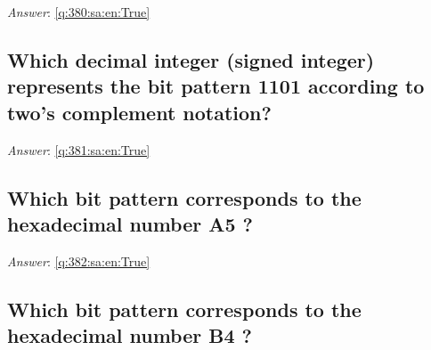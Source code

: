 \documentclass[a4paper,11pt,oneside]{article}
\begin{document}
\begin{sloppypar}
\label{q:380:sa:en:False}

\vspace{2cm}

\noindent\makebox[\textwidth]{\hrulefill}

\vspace{1cm}

\textit{Answer}: \autoref{q:380:sa:en:True}



\subsection{Which decimal integer (signed integer) represents the bit pattern 1101 according to two{\textquoteright}s complement notation?}

\label{q:381:sa:en:False}

\vspace{2cm}

\noindent\makebox[\textwidth]{\hrulefill}

\vspace{1cm}

\textit{Answer}: \autoref{q:381:sa:en:True}



\subsection{Which bit pattern corresponds to the hexadecimal number A5 ?}

\label{q:382:sa:en:False}

\vspace{2cm}

\noindent\makebox[\textwidth]{\hrulefill}

\vspace{1cm}

\textit{Answer}: \autoref{q:382:sa:en:True}



\subsection{Which bit pattern corresponds to the hexadecimal number B4 ?}

\label{q:383:sa:en:False}

\vspace{2cm}

\noindent\makebox[\textwidth]{\hrulefill}

\vspace{1cm}


\end{sloppypar}
\end{document}
